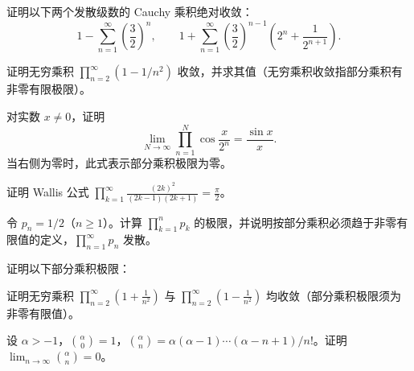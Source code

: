 \noindent\begin{minipage}{\textwidth}
证明以下两个发散级数的 Cauchy 乘积绝对收敛：\[1-\sum_{n=1}^{\infty}\left(\frac32\right)^n,\qquad1+\sum_{n=1}^{\infty}\left(\frac32\right)^{n-1}\left(2^n+\frac1{2^{n+1}}\right).\]
\end{minipage}\par\vfill
\newpage
\noindent\begin{minipage}{\textwidth}
证明无穷乘积 $\prod_{n=2}^{\infty}(1-1/n^2)$ 收敛，并求其值（无穷乘积收敛指部分乘积有非零有限极限）。
\end{minipage}\par\vfill
\noindent\begin{minipage}{\textwidth}
对实数 $x\ne0$，证明\[\lim_{N\to\infty}\prod_{n=1}^N\cos\frac{x}{2^n}=\frac{\sin x}{x}.\]当右侧为零时，此式表示部分乘积极限为零。
\end{minipage}\par\vfill
\noindent\begin{minipage}{\textwidth}
证明 Wallis 公式 $\displaystyle\prod_{k=1}^{\infty}\frac{(2k)^2}{(2k-1)(2k+1)}=\frac\pi2$。
\end{minipage}\par\vfill
\newpage
\noindent\begin{minipage}{\textwidth}
令 $p_n=1/2$（$n\ge1$）。计算 $\prod_{k=1}^np_k$ 的极限，并说明按部分乘积必须趋于非零有限值的定义，$\prod_{n=1}^{\infty}p_n$ 发散。
\end{minipage}\par\vfill
\noindent\begin{minipage}{\textwidth}
证明以下部分乘积极限：
\end{minipage}\par\vfill
\noindent\begin{minipage}{\textwidth}
证明无穷乘积 $\displaystyle\prod_{n=2}^{\infty}\left(1+\frac1{n^2}\right)$ 与 $\displaystyle\prod_{n=2}^{\infty}\left(1-\frac1{n^2}\right)$ 均收敛（部分乘积极限须为非零有限值）。
\end{minipage}\par\vfill
\newpage
\noindent\begin{minipage}{\textwidth}
设 $\alpha>-1$，$\binom\alpha0=1$，$\binom\alpha n=\alpha(\alpha-1)\cdots(\alpha-n+1)/n!$。证明 $\lim_{n\to\infty}\binom\alpha n=0$。
\end{minipage}\par\vfill
